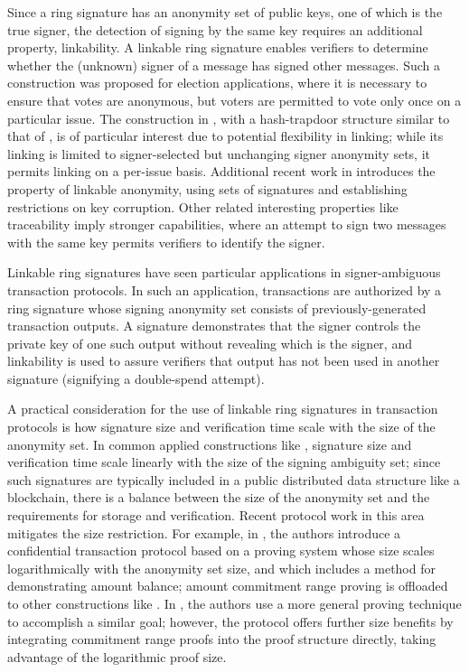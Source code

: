 \documentclass{article}
\theoremstyle{definition}
\begin{document}
Since a ring signature has an anonymity set of public keys, one of which is the true signer, the detection of signing by the same key requires an additional property, linkability.
A linkable ring signature \cite{lsag} enables verifiers to determine whether the (unknown) signer of a message has signed other messages.
Such a construction was proposed for election applications, where it is necessary to ensure that votes are anonymous, but voters are permitted to vote only once on a particular issue.
The construction in \cite{lsag}, with a hash-trapdoor structure similar to that of \cite{schnorr}, is of particular interest due to potential flexibility in linking; while its linking is limited to signer-selected but unchanging signer anonymity sets, it permits linking on a per-issue basis.
Additional recent work in \cite{backes} introduces the property of linkable anonymity, using sets of signatures and establishing restrictions on key corruption.
Other related interesting properties like traceability \cite{fs,f} imply stronger capabilities, where an attempt to sign two messages with the same key permits verifiers to identify the signer.

Linkable ring signatures have seen particular applications in signer-ambiguous transaction protocols.
In such an application, transactions are authorized by a ring signature whose signing anonymity set consists of previously-generated transaction outputs.
A signature demonstrates that the signer controls the private key of one such output without revealing which is the signer, and linkability is used to assure verifiers that output has not been used in another signature (signifying a double-spend attempt).

A practical consideration for the use of linkable ring signatures in transaction protocols is how signature size and verification time scale with the size of the anonymity set.
In common applied constructions like \cite{mlsag,clsag}, signature size and verification time scale linearly with the size of the signing ambiguity set; since such signatures are typically included in a public distributed data structure like a blockchain, there is a balance between the size of the anonymity set and the requirements for storage and verification.
Recent protocol work in this area mitigates the size restriction.
For example, in \cite{rct3}, the authors introduce a confidential transaction protocol based on a proving system whose size scales logarithmically with the anonymity set size, and which includes a method for demonstrating amount balance; amount commitment range proving is offloaded to other constructions like \cite{bulletproofs}.
In \cite{omniring}, the authors use a more general proving technique to accomplish a similar goal; however, the protocol offers further size benefits by integrating commitment range proofs into the proof structure directly, taking advantage of the logarithmic proof size.
\end{document}
